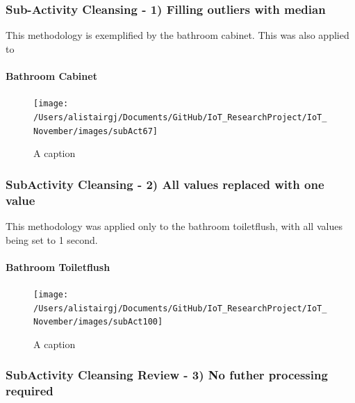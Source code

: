 \documentclass[11pt,]{article}
\let\oldparagraph\paragraph
\renewcommand{\paragraph}[1]{\oldparagraph{#1}\mbox{}}
\begin{document}
\hypertarget{sub-activity-cleansing---1-filling-outliers-with-median}{%
\subsubsection{Sub-Activity Cleansing - 1) Filling outliers with
median}\label{sub-activity-cleansing---1-filling-outliers-with-median}}

This methodology is exemplified by the bathroom cabinet. This was also
applied to

\hypertarget{bathroom-cabinet}{%
\paragraph{Bathroom Cabinet}\label{bathroom-cabinet}}

\begin{figure}[H]

{\centering \texttt{[image: /Users/alistairgj/Documents/GitHub/IoT\_ResearchProject/IoT\_November/images/subAct67]} 

}

\caption{A caption}\label{fig:subAct67}
\end{figure}

\hypertarget{subactivity-cleansing---2-all-values-replaced-with-one-value}{%
\subsubsection{SubActivity Cleansing - 2) All values replaced with one
value}\label{subactivity-cleansing---2-all-values-replaced-with-one-value}}

This methodology was applied only to the bathroom toiletflush, with all
values being set to 1 second.

\hypertarget{bathroom-toiletflush}{%
\paragraph{Bathroom Toiletflush}\label{bathroom-toiletflush}}

\begin{figure}[H]

{\centering \texttt{[image: /Users/alistairgj/Documents/GitHub/IoT\_ResearchProject/IoT\_November/images/subAct100]} 

}

\caption{A caption}\label{fig:subAct100}
\end{figure}

\hypertarget{subactivity-cleansing-review---3-no-futher-processing-required}{%
\subsubsection{SubActivity Cleansing Review - 3) No futher processing
required}\label{subactivity-cleansing-review---3-no-futher-processing-required}}
\end{document}
